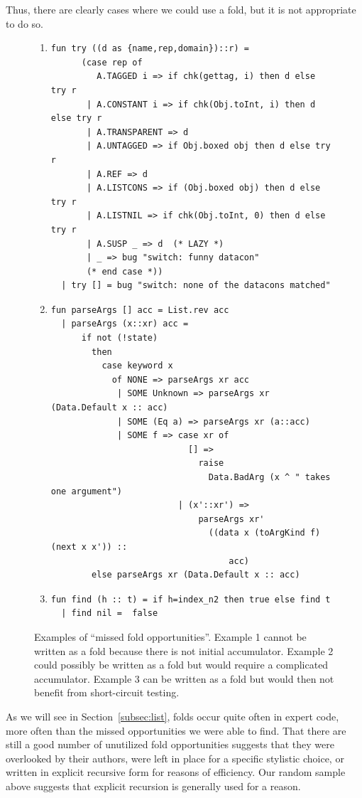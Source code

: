 \documentclass[12pt,abstracton]{scrartcl}
\begin{document}
Thus, there are clearly cases where we could use a fold,
but it is not appropriate to do so.
\begin{figure}
\begin{enumerate}
\item
\begin{verbatim}
fun try ((d as {name,rep,domain})::r) =
      (case rep of
         A.TAGGED i => if chk(gettag, i) then d else try r
       | A.CONSTANT i => if chk(Obj.toInt, i) then d else try r
       | A.TRANSPARENT => d
       | A.UNTAGGED => if Obj.boxed obj then d else try r
       | A.REF => d
       | A.LISTCONS => if (Obj.boxed obj) then d else try r
       | A.LISTNIL => if chk(Obj.toInt, 0) then d else try r
       | A.SUSP _ => d  (* LAZY *)
       | _ => bug "switch: funny datacon"
       (* end case *))
  | try [] = bug "switch: none of the datacons matched"
\end{verbatim}
\item
\begin{verbatim}
fun parseArgs [] acc = List.rev acc
  | parseArgs (x::xr) acc =
      if not (!state)
        then
          case keyword x
            of NONE => parseArgs xr acc
             | SOME Unknown => parseArgs xr (Data.Default x :: acc)
             | SOME (Eq a) => parseArgs xr (a::acc)
             | SOME f => case xr of
                           [] =>
                             raise
                               Data.BadArg (x ^ " takes one argument")
                         | (x'::xr') =>
                             parseArgs xr'
                               ((data x (toArgKind f) (next x x')) ::
                                   acc)
        else parseArgs xr (Data.Default x :: acc)
\end{verbatim}
\item
\begin{verbatim}
fun find (h :: t) = if h=index_n2 then true else find t
  | find nil =  false
\end{verbatim}
\end{enumerate}
\caption{Examples of ``missed fold opportunities''. Example 1 cannot be written as a fold
because there is not initial accumulator.
Example 2 could possibly be written as a fold but would require a complicated accumulator. Example 3
can be written as a fold but would then not benefit from short-circuit testing.}
\label{fig:fold}
\end{figure}
As we will see in Section~\ref{subsec:list}, folds occur quite often in
expert code, more often than the missed opportunities we were able to find.
That there are still a good number of unutilized fold opportunities
suggests that they were overlooked by their authors,
were left in place for a specific stylistic choice, or
written in explicit recursive form for reasons of efficiency.
Our random sample above suggests that explicit recursion
is generally used for a reason.
\end{document}

